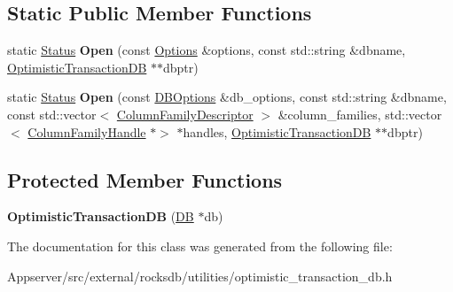 \subsection*{Static Public Member Functions}
\begin{DoxyCompactItemize}
\item 
static \hyperlink{classrocksdb_1_1Status}{Status} {\bfseries Open} (const \hyperlink{structrocksdb_1_1Options}{Options} \&options, const std\+::string \&dbname, \hyperlink{classrocksdb_1_1OptimisticTransactionDB}{Optimistic\+Transaction\+DB} $\ast$$\ast$dbptr)\hypertarget{classrocksdb_1_1OptimisticTransactionDB_a31f3542b7fddd3c2fe0d6d1050764561}{}\label{classrocksdb_1_1OptimisticTransactionDB_a31f3542b7fddd3c2fe0d6d1050764561}

\item 
static \hyperlink{classrocksdb_1_1Status}{Status} {\bfseries Open} (const \hyperlink{structrocksdb_1_1DBOptions}{D\+B\+Options} \&db\+\_\+options, const std\+::string \&dbname, const std\+::vector$<$ \hyperlink{structrocksdb_1_1ColumnFamilyDescriptor}{Column\+Family\+Descriptor} $>$ \&column\+\_\+families, std\+::vector$<$ \hyperlink{classrocksdb_1_1ColumnFamilyHandle}{Column\+Family\+Handle} $\ast$$>$ $\ast$handles, \hyperlink{classrocksdb_1_1OptimisticTransactionDB}{Optimistic\+Transaction\+DB} $\ast$$\ast$dbptr)\hypertarget{classrocksdb_1_1OptimisticTransactionDB_a82684a5683c06825d97dcc5fbed71b3a}{}\label{classrocksdb_1_1OptimisticTransactionDB_a82684a5683c06825d97dcc5fbed71b3a}

\end{DoxyCompactItemize}
\subsection*{Protected Member Functions}
\begin{DoxyCompactItemize}
\item 
{\bfseries Optimistic\+Transaction\+DB} (\hyperlink{classrocksdb_1_1DB}{DB} $\ast$db)\hypertarget{classrocksdb_1_1OptimisticTransactionDB_a61276475766982659400e78281815fe7}{}\label{classrocksdb_1_1OptimisticTransactionDB_a61276475766982659400e78281815fe7}

\end{DoxyCompactItemize}


The documentation for this class was generated from the following file\+:\begin{DoxyCompactItemize}
\item 
Appserver/src/external/rocksdb/utilities/optimistic\+\_\+transaction\+\_\+db.\+h\end{DoxyCompactItemize}
